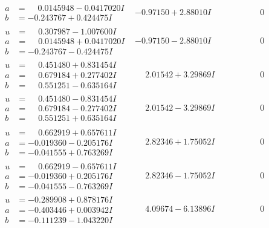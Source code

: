 \documentclass[1p]{elsarticle_modified}
\theoremstyle{definition}
\begin{document}
$$\begin{array}{c|c|c}
\begin{aligned}
a &= \phantom{-}0.0145948 - 0.0417020 I \\
b &= -0.243767 + 0.424475 I\end{aligned}
 & -0.97150 + 2.88010 I & \phantom{-0.000000 } 0 \\ \hline\begin{aligned}
u &= \phantom{-}0.307987 - 1.007600 I \\
a &= \phantom{-}0.0145948 + 0.0417020 I \\
b &= -0.243767 - 0.424475 I\end{aligned}
 & -0.97150 - 2.88010 I & \phantom{-0.000000 } 0 \\ \hline\begin{aligned}
u &= \phantom{-}0.451480 + 0.831454 I \\
a &= \phantom{-}0.679184 + 0.277402 I \\
b &= \phantom{-}0.551251 - 0.635164 I\end{aligned}
 & \phantom{-}2.01542 + 3.29869 I & \phantom{-0.000000 } 0 \\ \hline\begin{aligned}
u &= \phantom{-}0.451480 - 0.831454 I \\
a &= \phantom{-}0.679184 - 0.277402 I \\
b &= \phantom{-}0.551251 + 0.635164 I\end{aligned}
 & \phantom{-}2.01542 - 3.29869 I & \phantom{-0.000000 } 0 \\ \hline\begin{aligned}
u &= \phantom{-}0.662919 + 0.657611 I \\
a &= -0.019360 - 0.205176 I \\
b &= -0.041555 + 0.763269 I\end{aligned}
 & \phantom{-}2.82346 + 1.75052 I & \phantom{-0.000000 } 0 \\ \hline\begin{aligned}
u &= \phantom{-}0.662919 - 0.657611 I \\
a &= -0.019360 + 0.205176 I \\
b &= -0.041555 - 0.763269 I\end{aligned}
 & \phantom{-}2.82346 - 1.75052 I & \phantom{-0.000000 } 0 \\ \hline\begin{aligned}
u &= -0.289908 + 0.878176 I \\
a &= -0.403446 + 0.003942 I \\
b &= -0.111239 - 1.043220 I\end{aligned}
 & \phantom{-}4.09674 - 6.13896 I & \phantom{-0.000000 } 0 \\ \hline\begin{aligned}

\end{aligned}
\end{array}$$
\end{document}
